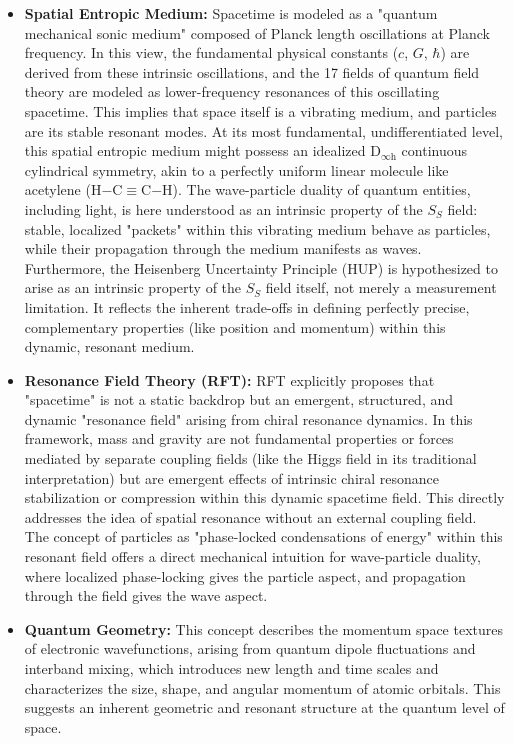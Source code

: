 \documentclass[11pt,a4paper]{article} %
\newcommand{\SSp}{S_S} %
\begin{document}
\begin{itemize}
    \item \textbf{Spatial Entropic Medium:} Spacetime is modeled as a "quantum mechanical sonic medium" composed of Planck length oscillations at Planck frequency. In this view, the fundamental physical constants ($c$, $G$, $\hbar$) are derived from these intrinsic oscillations, and the 17 fields of quantum field theory are modeled as lower-frequency resonances of this oscillating spacetime. This implies that space itself is a vibrating medium, and particles are its stable resonant modes. At its most fundamental, undifferentiated level, this spatial entropic medium might possess an idealized $\text{D}_{\infty\text{h}}$ continuous cylindrical symmetry, akin to a perfectly uniform linear molecule like acetylene (H$-$C$\equiv$C$-$H). The wave-particle duality of quantum entities, including light, is here understood as an intrinsic property of the $\SSp$ field: stable, localized "packets" within this vibrating medium behave as particles, while their propagation through the medium manifests as waves. Furthermore, the Heisenberg Uncertainty Principle (HUP) is hypothesized to arise as an intrinsic property of the $\SSp$ field itself, not merely a measurement limitation. It reflects the inherent trade-offs in defining perfectly precise, complementary properties (like position and momentum) within this dynamic, resonant medium.
    \item \textbf{Resonance Field Theory (RFT):} RFT explicitly proposes that "spacetime" is not a static backdrop but an emergent, structured, and dynamic "resonance field" arising from chiral resonance dynamics. In this framework, mass and gravity are not fundamental properties or forces mediated by separate coupling fields (like the Higgs field in its traditional interpretation) but are emergent effects of intrinsic chiral resonance stabilization or compression within this dynamic spacetime field. This directly addresses the idea of spatial resonance without an external coupling field. The concept of particles as "phase-locked condensations of energy" within this resonant field offers a direct mechanical intuition for wave-particle duality, where localized phase-locking gives the particle aspect, and propagation through the field gives the wave aspect.
    \item \textbf{Quantum Geometry:} This concept describes the momentum space textures of electronic wavefunctions, arising from quantum dipole fluctuations and interband mixing, which introduces new length and time scales and characterizes the size, shape, and angular momentum of atomic orbitals. This suggests an inherent geometric and resonant structure at the quantum level of space.
\end{itemize}
\end{document}
